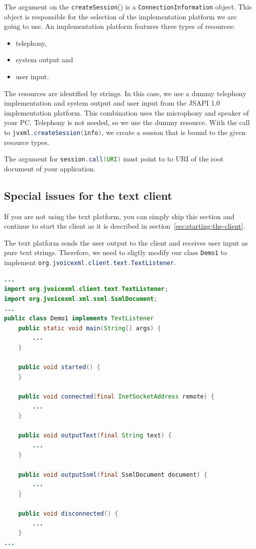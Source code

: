 \documentclass[11pt,a4paper]{article}
\begin{document}
The argument on the \lstinline[language=Java]{createSession}() is a
\lstinline[language=Java]{ConnectionInformation} object. This object is
responsible for the selection of the implementation platform we are going to
use. An implementation platform features three types of resources:
\begin{itemize}
  \item telephony,
  \item system output and
  \item user input.
\end{itemize}
The resources are identified by strings. In this case, we use a dummy telephony
implementation and system output and user input from the JSAPI 1.0
implementation platform. This combination uses the microphony and speaker of
your PC. Telephony is not needed, so we use the dummy resource. With the call to
\lstinline[language=Java]{jvxml.createSession(info)}, we create a session that
is bound to the given resource types.

The argument for \lstinline[language=Java]{session.call(URI)} must point to to URI of the
root document of your application.

\subsection{Special issues for the text client}

If you are not using the text platform, you can simply skip this section and
continue to start the client as it is described in
section~\ref{sec:starting-the-client}.

The text platform sends the user output to the client and receives user input as
pure text strings. Therefore, we need to sligtly modify our class
\lstinline[language=Java]{Demo1} to implement
\lstinline[language=Java]{org.jvoicexml.client.text.TextListener}. 

\begin{lstlisting}[language=Java]
...
import org.jvoicexml.client.text.TextListener;
import org.jvoicexml.xml.ssml.SsmlDocument;
...
public class Demo1 implements TextListener
    public static void main(String[] args) {
        ...
    }

    public void started() {
    }

    public void connected(final InetSocketAddress remote) {
        ...
    }

    public void outputText(final String text) {
        ...
    }

    public void outputSsml(final SsmlDocument document) {
        ...
    }

    public void disconnected() {
        ...
    }
...
\end{lstlisting}
\end{document}

